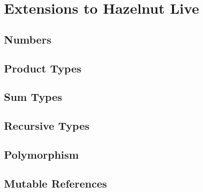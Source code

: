 \newcommand{\extensionsSec}{Extensions to Hazelnut Live}
\section{\protect\extensionsSec} %
\label{sec:extensions}

\subsection{Numbers}

\subsection{Product Types}

\subsection{Sum Types}


\subsection{Recursive Types}

\subsection{Polymorphism}

\subsection{Mutable References}

